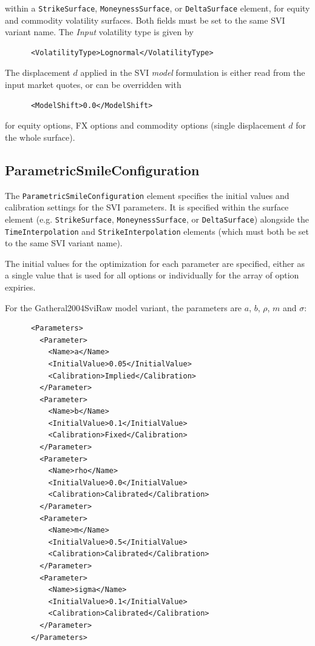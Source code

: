 \documentclass{amsart}
\theoremstyle{plain}
\numberwithin{equation}{section}
\begin{document}
within a \texttt{StrikeSurface}, \texttt{MoneynessSurface}, or
\texttt{DeltaSurface} element, for equity and commodity volatility surfaces. Both fields must be set to the same SVI variant name. The {\em Input} volatility type is given by

\begin{verbatim}
      <VolatilityType>Lognormal</VolatilityType>
\end{verbatim}

The displacement $d$ applied in the SVI {\em model} formulation is either read from the input market quotes, or can be
overridden with

\begin{verbatim}
      <ModelShift>0.0</ModelShift>
\end{verbatim}

for equity options, FX options and commodity options (single displacement $d$ for the whole surface).

\subsection{ParametricSmileConfiguration}

The \texttt{ParametricSmileConfiguration} element specifies the initial values and calibration settings for the SVI
parameters. It is specified within the surface element (e.g. \texttt{StrikeSurface}, \texttt{MoneynessSurface}, or
\texttt{DeltaSurface}) alongside the \texttt{TimeInterpolation} and \texttt{StrikeInterpolation} elements (which must both be set to the same SVI variant name).

The initial values for the optimization for each parameter are specified, either as a single value that is used for all
options or individually for the array of option expiries.

For the Gatheral2004SviRaw model variant, the parameters are $a$, $b$, $\rho$, $m$ and $\sigma$:

\begin{verbatim}
      <Parameters>
        <Parameter>
          <Name>a</Name>
          <InitialValue>0.05</InitialValue>
          <Calibration>Implied</Calibration>
        </Parameter>
        <Parameter>
          <Name>b</Name>
          <InitialValue>0.1</InitialValue>
          <Calibration>Fixed</Calibration>
        </Parameter>
        <Parameter>
          <Name>rho</Name>
          <InitialValue>0.0</InitialValue>
          <Calibration>Calibrated</Calibration>
        </Parameter>
        <Parameter>
          <Name>m</Name>
          <InitialValue>0.5</InitialValue>
          <Calibration>Calibrated</Calibration>
        </Parameter>
        <Parameter>
          <Name>sigma</Name>
          <InitialValue>0.1</InitialValue>
          <Calibration>Calibrated</Calibration>
        </Parameter>
      </Parameters>
\end{verbatim}
\end{document}
